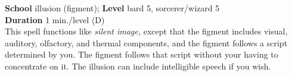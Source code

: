 \textbf{School} illusion (figment); \textbf{Level} bard 5, sorcerer/wizard 5\\
\textbf{Duration} 1 min./level (D)\\
This spell functions like \textit{silent image, }except that the figment includes visual, auditory, olfactory, and thermal components, and the figment follows a script determined by you. The figment follows that script without your having to concentrate on it. The illusion can include intelligible speech if you wish. \\
